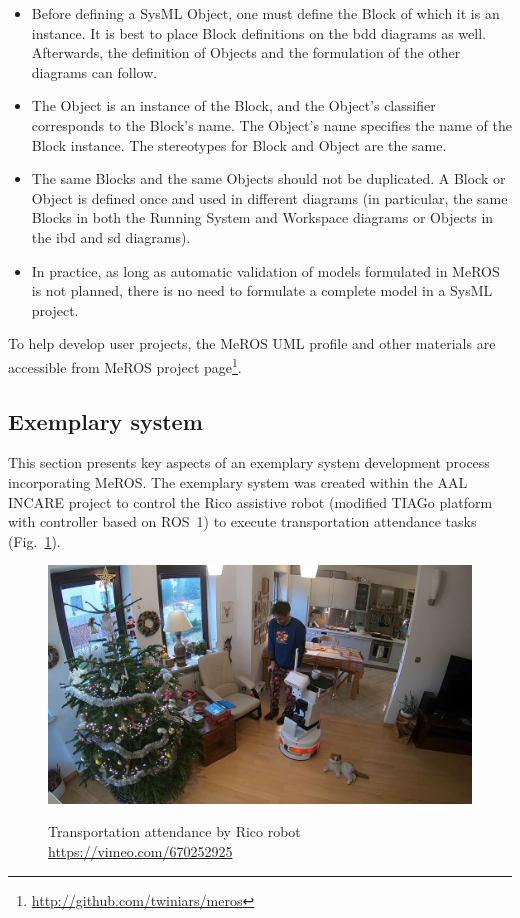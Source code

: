 \documentclass[11pt,oneside,a4paper]{article}
\begin{document}
	\begin{itemize}
		\item Before defining a SysML Object, one must define the Block of which it is an instance. It is best to place Block definitions on the bdd diagrams as well. Afterwards, the definition of Objects and the formulation of the other diagrams can follow.
		\item The Object is an instance of the Block, and the Object's classifier corresponds to the Block's name. The Object's name specifies the name of the Block instance. The stereotypes for Block and Object are the same.
		\item The same Blocks and the same Objects should not be duplicated. A Block or Object is defined once and used in different diagrams (in particular, the same Blocks in both the Running System and Workspace diagrams or Objects in the ibd and sd diagrams).
		\item In practice, as long as automatic validation of models formulated in MeROS is not planned, there is no need to formulate a complete model in a SysML project. 
	\end{itemize}
		
	To help develop user projects, the MeROS UML profile and other materials are accessible from MeROS project page\footnote{\url{http://github.com/twiniars/meros}}. 
	
	
\subsection{Exemplary system}
\label{sec:application-example}

	This section presents key aspects of an exemplary system development process incorporating MeROS. The exemplary system was created within the AAL INCARE project to control the Rico assistive robot (modified TIAGo platform with controller based on ROS~1) to execute transportation attendance tasks (Fig.~\ref{fig:herbatka_u_winiara}).
	
	\begin{figure}[H]
		\centering
		\begin{center}
			{\includegraphics[width=.9\columnwidth]{img/herbatka_u_winiara.jpg}}
		\end{center}
		\caption{Transportation attendance by Rico robot \url{https://vimeo.com/670252925}} 
		\label{fig:herbatka_u_winiara}
	\end{figure}
	
\end{document}

